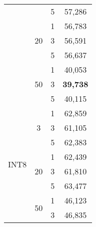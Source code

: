 \begin{table}[]
\begin{tabular}{cccc}
		\multicolumn{1}{|c|}{}   & \multicolumn{1}{c|}{}          & \multicolumn{1}{c|}{5}  & \multicolumn{1}{c|}{57,286}    \\ \cline{2-4} 
		\multicolumn{1}{|c|}{}   & \multicolumn{1}{c|}{\multirow{3}{*}{20}} & \multicolumn{1}{c|}{1}  & \multicolumn{1}{c|}{56,783}    \\ \cline{3-4} 
		\multicolumn{1}{|c|}{}   & \multicolumn{1}{c|}{}          & \multicolumn{1}{c|}{3}  & \multicolumn{1}{c|}{56,591}    \\ \cline{3-4} 
		\multicolumn{1}{|c|}{}   & \multicolumn{1}{c|}{}          & \multicolumn{1}{c|}{5}  & \multicolumn{1}{c|}{56,637}    \\ \cline{2-4} 
		\multicolumn{1}{|c|}{}   & \multicolumn{1}{c|}{\multirow{3}{*}{50}} & \multicolumn{1}{c|}{1}  & \multicolumn{1}{c|}{40,053}    \\ \cline{3-4} 
		\multicolumn{1}{|c|}{}   & \multicolumn{1}{c|}{}          & \multicolumn{1}{c|}{3}  & \multicolumn{1}{c|}{\textbf{39,738}}    \\ \cline{3-4} 
		\multicolumn{1}{|c|}{}   & \multicolumn{1}{c|}{}          & \multicolumn{1}{c|}{5}  & \multicolumn{1}{c|}{40,115}    \\ \hline
		\multicolumn{1}{|c|}{\multirow{9}{*}{INT8}} & \multicolumn{1}{c|}{\multirow{3}{*}{3}}  & \multicolumn{1}{c|}{1}  & \multicolumn{1}{c|}{62,859}    \\ \cline{3-4} 
		\multicolumn{1}{|c|}{}   & \multicolumn{1}{c|}{}          & \multicolumn{1}{c|}{3}  & \multicolumn{1}{c|}{61,105}    \\ \cline{3-4} 
		\multicolumn{1}{|c|}{}   & \multicolumn{1}{c|}{}          & \multicolumn{1}{c|}{5}  & \multicolumn{1}{c|}{62,383}    \\ \cline{2-4} 
		\multicolumn{1}{|c|}{}   & \multicolumn{1}{c|}{\multirow{3}{*}{20}} & \multicolumn{1}{c|}{1}  & \multicolumn{1}{c|}{62,439}    \\ \cline{3-4} 
		\multicolumn{1}{|c|}{}   & \multicolumn{1}{c|}{}          & \multicolumn{1}{c|}{3}  & \multicolumn{1}{c|}{61,810}    \\ \cline{3-4} 
		\multicolumn{1}{|c|}{}   & \multicolumn{1}{c|}{}          & \multicolumn{1}{c|}{5}  & \multicolumn{1}{c|}{63,477}    \\ \cline{2-4} 
		\multicolumn{1}{|c|}{}   & \multicolumn{1}{c|}{\multirow{3}{*}{50}} & \multicolumn{1}{c|}{1}  & \multicolumn{1}{c|}{46,123}    \\ \cline{3-4} 
		\multicolumn{1}{|c|}{}   & \multicolumn{1}{c|}{}          & \multicolumn{1}{c|}{3}  & \multicolumn{1}{c|}{46,835}    \\ \cline{3-4} 

\end{tabular}
\end{table}
